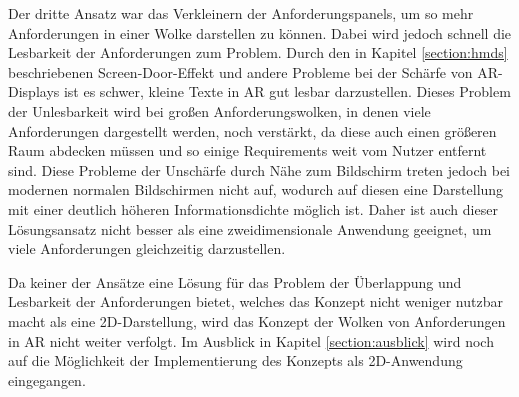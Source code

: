 Der dritte Ansatz war das Verkleinern der Anforderungspanels, um so mehr Anforderungen in einer Wolke darstellen zu können.
Dabei wird jedoch schnell die Lesbarkeit der Anforderungen zum Problem.
Durch den in Kapitel \ref{section:hmds} beschriebenen Screen-Door-Effekt und andere Probleme bei der Schärfe von AR-Displays ist es schwer, kleine Texte in AR gut lesbar darzustellen.
Dieses Problem der Unlesbarkeit wird bei großen Anforderungswolken, in denen viele Anforderungen dargestellt werden, noch verstärkt, da diese auch einen größeren Raum abdecken müssen und so einige Requirements weit vom Nutzer entfernt sind.
Diese Probleme der Unschärfe durch Nähe zum Bildschirm treten jedoch bei modernen normalen Bildschirmen nicht auf, wodurch auf diesen eine Darstellung mit einer deutlich höheren Informationsdichte möglich ist.
Daher ist auch dieser Lösungsansatz nicht besser als eine zweidimensionale Anwendung geeignet, um viele Anforderungen gleichzeitig darzustellen.

Da keiner der Ansätze eine Lösung für das Problem der Überlappung und Lesbarkeit der Anforderungen bietet, welches das Konzept nicht weniger nutzbar macht als eine 2D-Darstellung, wird das Konzept der Wolken von Anforderungen in AR nicht weiter verfolgt.
Im Ausblick in Kapitel \ref{section:ausblick} wird noch auf die Möglichkeit der Implementierung des Konzepts als 2D-Anwendung eingegangen.